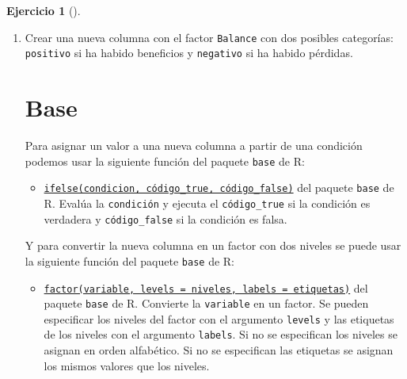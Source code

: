 \documentclass[
  a4paper,
]{scrreport}
\newenvironment{Shaded}{\begin{snugshade}}{\end{snugshade}}
\newcommand{\ExtensionTok}[1]{\textcolor[rgb]{0.00,0.23,0.31}{#1}}
\newcommand{\NormalTok}[1]{\textcolor[rgb]{0.00,0.23,0.31}{#1}}
\providecommand{\tightlist}{%
  \setlength{\itemsep}{0pt}\setlength{\parskip}{0pt}}\usepackage{longtable,booktabs,array}
\theoremstyle{definition}
\newtheorem{exercise}{Ejercicio}[chapter]
\theoremstyle{remark}
\begin{document}
\begin{exercise}[]
\begin{enumerate}
\begin{tcolorbox}
  \section{Copilot}

\begin{Shaded}
\begin{Highlighting}[]
\ExtensionTok{Añadir}\NormalTok{ al data frame df una nueva columna de nombre Beneficios con los beneficios de cada mes.}
\end{Highlighting}
\end{Shaded}

  \end{tcolorbox}
\item
  Crear una nueva columna con el factor \texttt{Balance} con dos
  posibles categorías: \texttt{positivo} si ha habido beneficios y
  \texttt{negativo} si ha habido pérdidas.

  \begin{tcolorbox}[enhanced jigsaw, colframe=quarto-callout-tip-color-frame, toprule=.15mm, bottomtitle=1mm, breakable, opacitybacktitle=0.6, toptitle=1mm, colback=white, bottomrule=.15mm, title=\textcolor{quarto-callout-tip-color}{\faLightbulb}\hspace{0.5em}{Solución}, arc=.35mm, left=2mm, titlerule=0mm, rightrule=.15mm, coltitle=black, leftrule=.75mm, opacityback=0, colbacktitle=quarto-callout-tip-color!10!white]

  \section{Base}

  Para asignar un valor a una nueva columna a partir de una condición
  podemos usar la siguiente función del paquete \texttt{base} de R:

  \begin{itemize}
  \tightlist
  \item
    \href{https://rdrr.io/r/base/ifelse.html}{\texttt{ifelse(condicion,\ código\_true,\ código\_false)}}
    del paquete \texttt{base} de R. Evalúa la \texttt{condición} y
    ejecuta el \texttt{código\_true} si la condición es verdadera y
    \texttt{código\_false} si la condición es falsa.
  \end{itemize}

  Y para convertir la nueva columna en un factor con dos niveles se
  puede usar la siguiente función del paquete \texttt{base} de R:

  \begin{itemize}
  \tightlist
  \item
    \href{https://rdrr.io/r/base/factor.html}{\texttt{factor(variable,\ levels\ =\ niveles,\ labels\ =\ etiquetas)}}
    del paquete \texttt{base} de R. Convierte la \texttt{variable} en un
    factor. Se pueden especificar los niveles del factor con el
    argumento \texttt{levels} y las etiquetas de los niveles con el
    argumento \texttt{labels}. Si no se especifican los niveles se
    asignan en orden alfabético. Si no se especifican las etiquetas se
    asignan los mismos valores que los niveles.
  \end{itemize}


\end{tcolorbox}
\end{enumerate}
\end{exercise}
\end{document}

